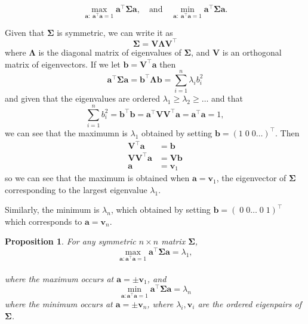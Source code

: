 \documentclass[
]{book}
\newtheorem{proposition}{Proposition}[chapter]
\theoremstyle{definition}
\theoremstyle{definition}
\theoremstyle{definition}
\theoremstyle{definition}
\theoremstyle{remark}
\begin{document}
\begin{equation}
\max_{\mathbf a: \;\mathbf a^\top \mathbf a=1}\mathbf a^\top \boldsymbol{\Sigma}\mathbf a, \quad \mbox{and}\quad
\min_{\mathbf a: \;\mathbf a^\top \mathbf a=1}\mathbf a^\top \boldsymbol{\Sigma}\mathbf a.
\label{eq:eigenopt}
\end{equation}

Given that \(\boldsymbol{\Sigma}\) is symmetric, we can write it as
\[\boldsymbol{\Sigma}= \mathbf V\boldsymbol \Lambda\mathbf V^\top \]
where \(\boldsymbol \Lambda\) is the diagonal matrix of eigenvalues of \(\boldsymbol{\Sigma}\), and \(\mathbf V\) is an orthogonal matrix of eigenvectors. If we let \(\mathbf b=\mathbf V^\top \mathbf a\) then
\[\mathbf a^\top \boldsymbol{\Sigma}\mathbf a= \mathbf b^\top \boldsymbol \Lambda\mathbf b= \sum_{i=1}^n \lambda_i b_i^2\]
and given that the eigenvalues are ordered \(\lambda_1\geq \lambda_2 \geq \ldots\) and that \[\sum_{i=1}^n b_i^2=\mathbf b^\top\mathbf b=\mathbf a^\top \mathbf V\mathbf V^\top\mathbf a=\mathbf a^\top\mathbf a=1,\]
we can see that the maximumn is \(\lambda_1\) obtained by setting \(\mathbf b=(1\;0\;0 \ldots)^\top\). Then
\begin{align*}
\mathbf V^\top \mathbf a&= \mathbf b\\
\mathbf V\mathbf V^\top \mathbf a&=\mathbf V\mathbf b\\
\mathbf a&= \mathbf v_1
\end{align*}
so we can see that the maximum is obtained when \(\mathbf a=\mathbf v_1\), the eigenvector of \(\boldsymbol{\Sigma}\) corresponding to the largest eigenvalue \(\lambda_1\).

Similarly, the minimum is \(\lambda_n\), which obtained by setting \(\mathbf b=(\;0\;0 \ldots\;0\;1)^\top\) which corresponds to \(\mathbf a=\mathbf v_n\).

\begin{proposition}
\protect\hypertarget{prp:two8}{}\label{prp:two8}For any symmetric \(n \times n\) matrix \(\boldsymbol{\Sigma}\),
\[\max_{\mathbf a: \mathbf a^\top \mathbf a=1} \mathbf a^\top\boldsymbol{\Sigma}\mathbf a=\lambda_1,\]\\
where the maximum occurs at \(\mathbf a=\pm \mathbf v_1\), and
\[\min_{\mathbf a: \mathbf a^\top \mathbf a=1} \mathbf a^\top\boldsymbol{\Sigma}\mathbf a=\lambda_n\]
where the minimum occurs at \(\mathbf a= \pm \mathbf v_n\), where \(\lambda_i, \mathbf v_i\) are the ordered eigenpairs of \(\boldsymbol{\Sigma}\).
\end{proposition}
\end{document}
